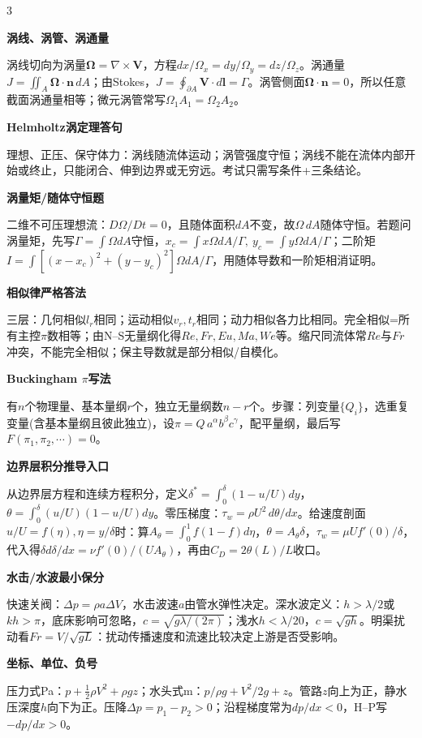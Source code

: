 \documentclass[a4paper]{article}
\newcommand{\qt}[1]{\vspace{0.25pt}\colorbox{Q}{\parbox{\dimexpr\linewidth-2\fboxsep}{\color{white}\bfseries #1}}\par}
\newcommand{\sect}[1]{\qt{#1}}
\begin{document}
\begin{multicols}{3}
{\sect{涡线、涡管、涡通量}
涡线切向为涡量$\bm\Omega=\nabla\times\bm V$，方程$dx/\Omega_x=dy/\Omega_y=dz/\Omega_z$。涡通量$J=\iint_A\bm\Omega\cdot\bm n\,dA$；由Stokes，$J=\oint_{\partial A}\bm V\cdot d\bm l=\Gamma$。涡管侧面$\bm\Omega\cdot\bm n=0$，所以任意截面涡通量相等；微元涡管常写$\Omega_1A_1=\Omega_2A_2$。
\sect{Helmholtz涡定理答句}
理想、正压、保守体力：涡线随流体运动；涡管强度守恒；涡线不能在流体内部开始或终止，只能闭合、伸到边界或无穷远。考试只需写条件+三条结论。
\sect{涡量矩/随体守恒题}
二维不可压理想流：$D\Omega/Dt=0$，且随体面积$dA$不变，故$\Omega\,dA$随体守恒。若题问涡量矩，先写$\Gamma=\int\Omega dA$守恒，$x_c=\int x\Omega dA/\Gamma,\ y_c=\int y\Omega dA/\Gamma$；二阶矩$I=\int[(x-x_c)^2+(y-y_c)^2]\Omega dA/\Gamma$，用随体导数和一阶矩相消证明。
\sect{相似律严格答法}
三层：几何相似$l_r$相同；运动相似$v_r,t_r$相同；动力相似各力比相同。完全相似=所有主控$\pi$数相等；由N--S无量纲化得$Re,Fr,Eu,Ma,We$等。缩尺同流体常$Re$与$Fr$冲突，不能完全相似；保主导数就是部分相似/自模化。
\sect{Buckingham $\pi$写法}
有$n$个物理量、基本量纲$r$个，独立无量纲数$n-r$个。步骤：列变量$\{Q_i\}$，选重复变量(含基本量纲且彼此独立)，设$\pi=Q\,a^\alpha b^\beta c^\gamma$，配平量纲，最后写$F(\pi_1,\pi_2,\cdots)=0$。
\sect{边界层积分推导入口}
从边界层方程和连续方程积分，定义$\delta^*=\int_0^\delta(1-u/U)dy$，$\theta=\int_0^\delta(u/U)(1-u/U)dy$。零压梯度：$\tau_w=\rho U^2\,d\theta/dx$。给速度剖面$u/U=f(\eta),\eta=y/\delta$时：算$A_\theta=\int_0^1f(1-f)d\eta$，$\theta=A_\theta\delta$，$\tau_w=\mu U f'(0)/\delta$，代入得$\delta d\delta/dx=\nu f'(0)/(UA_\theta)$，再由$C_D=2\theta(L)/L$收口。
\sect{水击/水波最小保分}
快速关阀：$\Delta p=\rho a\Delta V$，水击波速$a$由管水弹性决定。深水波定义：$h>\lambda/2$或$kh>\pi$，底床影响可忽略，$c=\sqrt{g\lambda/(2\pi)}$；浅水$h<\lambda/20$，$c=\sqrt{gh}$。明渠扰动看$Fr=V/\sqrt{gL}$：扰动传播速度和流速比较决定上游是否受影响。
\sect{坐标、单位、负号}
压力式Pa：$p+\frac12\rho V^2+\rho gz$；水头式m：$p/\rho g+V^2/2g+z$。管路$z$向上为正，静水压深度$h$向下为正。压降$\Delta p=p_1-p_2>0$；沿程梯度常为$dp/dx<0$，H--P写$-dp/dx>0$。

}
\end{multicols}
\end{document}
